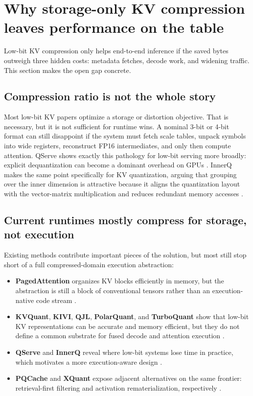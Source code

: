 \documentclass[11pt]{article}
\newcommand{\kv}{KV}
\begin{document}
\section{Why storage-only \kv{} compression leaves performance on the table}

Low-bit \kv{} compression only helps end-to-end inference if the saved bytes outweigh three hidden costs: metadata fetches, decode work, and widening traffic. This section makes the open gap concrete.

\subsection{Compression ratio is not the whole story}

Most low-bit \kv{} papers optimize a storage or distortion objective. That is necessary, but it is not sufficient for runtime wins. A nominal 3-bit or 4-bit format can still disappoint if the system must fetch scale tables, unpack symbols into wide registers, reconstruct FP16 intermediates, and only then compute attention. QServe shows exactly this pathology for low-bit serving more broadly: explicit dequantization can become a dominant overhead on GPUs \cite{qserve}. InnerQ makes the same point specifically for \kv{} quantization, arguing that grouping over the inner dimension is attractive because it aligns the quantization layout with the vector-matrix multiplication and reduces redundant memory accesses \cite{innerq}.

\subsection{Current runtimes mostly compress for storage, not execution}

Existing methods contribute important pieces of the solution, but most still stop short of a full compressed-domain execution abstraction:
\begin{itemize}
    \item \textbf{PagedAttention} organizes \kv{} blocks efficiently in memory, but the abstraction is still a block of conventional tensors rather than an execution-native code stream \cite{pagedattention}.
    \item \textbf{KVQuant}, \textbf{KIVI}, \textbf{QJL}, \textbf{PolarQuant}, and \textbf{TurboQuant} show that low-bit \kv{} representations can be accurate and memory efficient, but they do not define a common substrate for fused decode and attention execution \cite{kvquant,kivi,qjl,polarquant,turboquant}.
    \item \textbf{QServe} and \textbf{InnerQ} reveal where low-bit systems lose time in practice, which motivates a more execution-aware design \cite{qserve,innerq}.
    \item \textbf{PQCache} and \textbf{XQuant} expose adjacent alternatives on the same frontier: retrieval-first filtering and activation rematerialization, respectively \cite{pqcache,xquant}.
\end{itemize}
\end{document}
